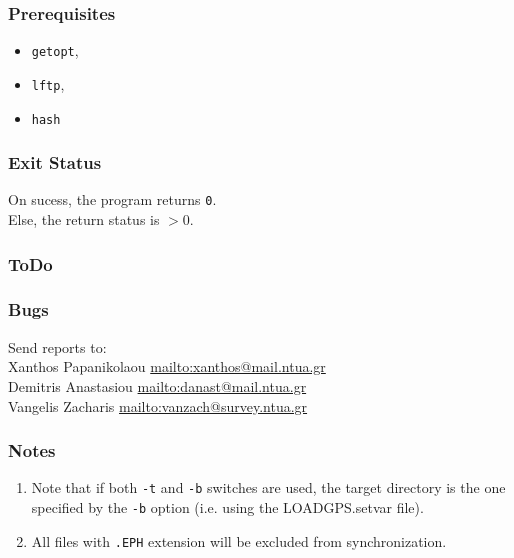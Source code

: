 \subsubsection{Prerequisites}
\begin{itemize}
\item \texttt{getopt},
\item \texttt{lftp}, 
\item \texttt{hash}
\end{itemize}

\subsubsection{Exit Status}
On sucess, the program returns \texttt{0}.\\
Else, the return status is $>$0.

\subsubsection{ToDo}

\subsubsection{Bugs}
Send reports to:\\
Xanthos Papanikolaou \href{mailto:xanthos@mail.ntua.gr}{mailto:xanthos@mail.ntua.gr}\\
Demitris Anastasiou  \href{mailto:danast@mail.ntua.gr}{mailto:danast@mail.ntua.gr}\\
Vangelis Zacharis  \href{mailto:vanzach@survey.ntua.gr}{mailto:vanzach@survey.ntua.gr}\\
\bigskip


\subsubsection{Notes}\label{sec:syncwbern52_notes}
\begin{enumerate}[label=\arabic*]
\item Note that if both \texttt{-t} and \texttt{-b} switches are used, 
the target directory is the one specified by the \texttt{-b} option 
(i.e. using the LOADGPS.setvar file).\\
\item All files with \texttt{.EPH} extension will be excluded from synchronization.
\end{enumerate}